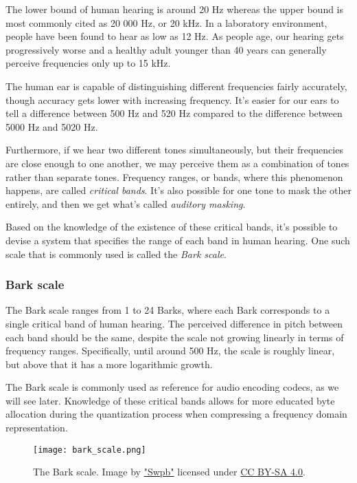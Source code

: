 The lower bound of human hearing is around 20 Hz whereas the upper bound is most commonly cited as 20 000 Hz, or 20 kHz. \cite{rosen1993hearing} In a laboratory environment, people have been found to hear as low as 12 Hz. As people age, our hearing gets progressively worse and a healthy adult younger than 40 years can generally perceive frequencies only up to 15 kHz. \cite{olson1967music}

The human ear is capable of distinguishing different frequencies fairly accurately, though accuracy gets lower with increasing frequency. It's easier for our ears to tell a difference between 500 Hz and 520 Hz compared to the difference between 5000 Hz and 5020 Hz. \cite{smacdon_2018}

Furthermore, if we hear two different tones simultaneously, but their frequencies are close enough to one another, we may perceive them as a combination of tones rather than separate tones. Frequency ranges, or bands, where this phenomenon happens, are called \emph{critical bands}. \cite{fletcher_1940} It's also possible for one tone to mask the other entirely, and then we get what's called \emph{auditory masking}. \cite{gelfand1990hearing}

Based on the knowledge of the existence of these critical bands, it's possible to devise a system that specifies the range of each band in human hearing. One such scale that is commonly used is called the \emph{Bark scale}.

\subsubsection{Bark scale}
The Bark scale ranges from 1 to 24 Barks, where each Bark corresponds to a single critical band of human hearing. \cite{fastl_2006} The perceived difference in pitch between each band should be the same, despite the scale not growing linearly in terms of frequency ranges. Specifically, until around 500 Hz, the scale is roughly linear, but above that it has a more logarithmic growth. \cite{hermes_filter}

The Bark scale is commonly used as reference for audio encoding codecs, as we will see later. Knowledge of these critical bands allows for more educated byte allocation during the quantization process when compressing a frequency domain representation.

\begin{figure}[ht]
	\caption[Bark scale]{The Bark scale. Image by \href{https://commons.wikimedia.org/wiki/User:Swpb}{"Swpb"} licensed under \href{https://creativecommons.org/licenses/by-sa/4.0/deed.en}{CC BY-SA 4.0}.}
	\centering
	\texttt{[image: bark\_scale.png]}
\end{figure}

